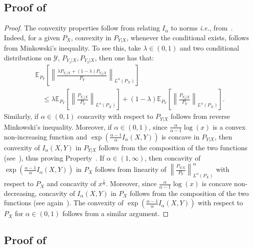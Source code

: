 \documentclass{article}
\numberwithin{theorem}{section}
\numberwithin{example}{section}
\numberwithin{remark}{section}
\numberwithin{definition}{section}
\newcommand{\Y}{\mathcal{Y}}
\begin{document}
\subsection{Proof of~}\label{proof:convexityproperties}
\begin{proof} The convexity properties follow from relating $I_\alpha$ to norms \textit{i.e.}, from~. Indeed, for a given $P_X$, convexity in $P_{Y|X}$, whenever the conditional exists, follows from Minkowski's inequality. To see this, take $\lambda\in (0,1)$ and two conditional distributions on $\Y$, $P_{Y_1|X},P_{Y_2|X}$, then one has that:
    \begin{align}
    &\mathbb{E}_{P_Y}\left[\left\lVert \frac{\lambda P_{Y_1|X}+(1-\lambda)P_{Y_2|X}}{P_Y}\right\rVert_{L^\alpha(P_X)}\right] \\&\hspace{1em} \leq  \lambda\mathbb{E}_{P_Y}\left[\left\lVert \frac{ P_{Y_1|X}}{P_Y}\right\rVert_{L^\alpha(P_X)}\right] + (1-\lambda)\mathbb{E}_{P_Y}\left[\left\lVert \frac{ P_{Y_2|X}}{P_Y}\right\rVert_{L^\alpha(P_X)}\right].
    \end{align}
    Similarly, if $\alpha\in (0,1)$ concavity with respect to $P_{Y|X}$ follows from reverse Minkowski's inequality. Moreover, if $\alpha\in(0,1)$, since $\frac{\alpha}{\alpha-1}\log(x)$ is a convex non-increasing function and $\exp\left(\frac{\alpha-1}{\alpha}I_\alpha(X,Y)\right)$ is concave in $P_{Y|X}$, then convexity of $I_\alpha(X,Y)$ in $P_{Y|X}$ follows from the composition of the two functions (see~\cite[Eq. (3.10)]{boyd}), thus proving Property~.
    If $\alpha \in (1,\infty)$, then concavity of $\exp\left(\frac{\alpha-1}{\alpha}I_\alpha(X,Y)\right)$ in $P_X$ follows from linearity of $\left\lVert \frac{P_{Y|X}}{P_Y}\right\rVert_{L^\alpha(P_X)}^\alpha$ with respect to $P_X$ and concavity of $x^\frac1\alpha$. Moreover, since $\frac{\alpha}{\alpha-1}\log(x)$ is concave non-decreasing, concavity of $I_\alpha(X,Y)$ in $P_X$ follows from the composition of the two functions (see again~\cite[Eq. (3.10)]{boyd}). The convexity of $\exp\left(\frac{\alpha-1}{\alpha}I_\alpha(X,Y)\right)$ with respect to $P_X$ for $\alpha\in(0,1)$ follows from a similar argument. 
    \end{proof}


\subsection{Proof of~}\label{app:proof:thm:Riouletal}
\end{document}
